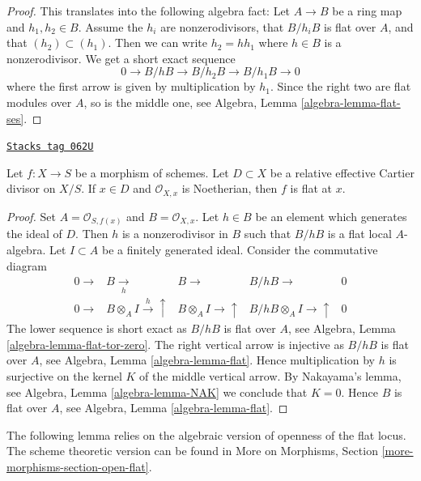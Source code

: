 \begin{proof}
This translates into the following algebra fact:
Let $A \to B$ be a ring map and $h_1, h_2 \in B$.
Assume the $h_i$ are nonzerodivisors, that $B/h_iB$ is flat over $A$, and
that $(h_2) \subset (h_1)$. Then we can write $h_2 = h h_1$
where $h \in B$ is a nonzerodivisor. We get a short exact sequence
$$
0 \to B/hB \to B/h_2B \to B/h_1B \to 0
$$
where the first arrow is given by multiplication by $h_1$. Since
the right two are flat modules over $A$, so is the middle one, see
Algebra, Lemma \ref{algebra-lemma-flat-ses}.
\end{proof}

\begin{lemma}[Flat at x]
\label{divisors-lemma-flat-at-x}
\href{https://stacks.math.columbia.edu/tag/062U}{\texttt{Stacks tag 062U}}

Let $f : X \to S$ be a morphism of schemes.
Let $D \subset X$ be a relative effective Cartier divisor on $X/S$.
If $x \in D$ and $\mathcal{O}_{X, x}$ is Noetherian, then $f$ is flat at $x$.
\end{lemma}

\begin{proof}
Set $A = \mathcal{O}_{S, f(x)}$ and $B = \mathcal{O}_{X, x}$.
Let $h \in B$ be an element which generates the ideal of $D$.
Then $h$ is a nonzerodivisor in $B$ such that $B/hB$ is a flat
local $A$-algebra. Let $I \subset A$ be a finitely generated ideal.
Consider the commutative diagram
$$
\begin{array}{ccccc}0 \longrightarrow & B \underset{h}{\longrightarrow} & B \longrightarrow & B/hB \longrightarrow & 0 \\ 0 \longrightarrow & B \otimes_A I \overset{h}{\longrightarrow}\uparrow & B \otimes_A I \longrightarrow\uparrow & B/hB \otimes_A I \longrightarrow\uparrow & 0\end{array}
$$
The lower sequence is short exact as $B/hB$ is flat over $A$, see
Algebra, Lemma \ref{algebra-lemma-flat-tor-zero}.
The right vertical arrow is injective as $B/hB$ is flat over $A$, see
Algebra, Lemma \ref{algebra-lemma-flat}.
Hence multiplication by $h$ is surjective on the kernel $K$ of
the middle vertical arrow. By Nakayama's lemma, see
Algebra, Lemma \ref{algebra-lemma-NAK}
we conclude that $K= 0$. Hence $B$ is flat over $A$, see
Algebra, Lemma \ref{algebra-lemma-flat}.
\end{proof}

The following lemma relies on the algebraic version of
openness of the flat locus. The scheme theoretic version can be found in
More on Morphisms, Section \ref{more-morphisms-section-open-flat}.


